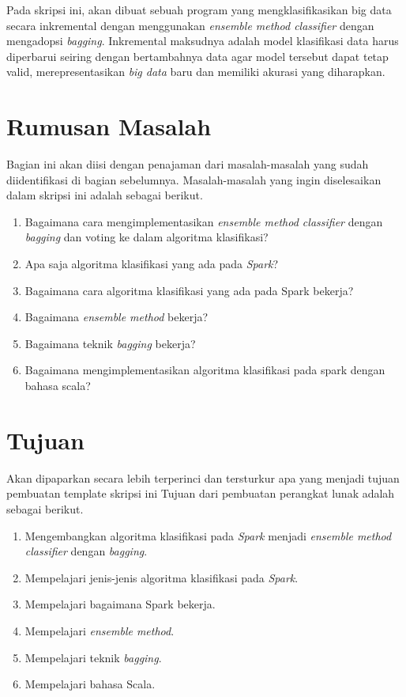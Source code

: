 Pada skripsi ini, akan dibuat sebuah program yang mengklasifikasikan big data secara inkremental dengan menggunakan \textit{ensemble method classifier} dengan mengadopsi \textit{bagging}. Inkremental maksudnya adalah model klasifikasi data harus diperbarui seiring dengan bertambahnya data agar model tersebut dapat tetap valid, merepresentasikan \textit{big data} baru dan memiliki akurasi yang diharapkan.

\section{Rumusan Masalah}
\label{sec:rumusan}
Bagian ini akan diisi dengan penajaman dari masalah-masalah yang sudah diidentifikasi di bagian sebelumnya. 
Masalah-masalah yang ingin diselesaikan dalam skripsi ini adalah sebagai berikut.
\begin{enumerate}
\item Bagaimana cara mengimplementasikan \textit{ensemble method classifier} dengan \textit{bagging} dan voting ke dalam algoritma klasifikasi?
\item Apa saja algoritma klasifikasi yang ada pada \textit{Spark}?
\item Bagaimana cara algoritma klasifikasi yang ada pada Spark bekerja?
\item Bagaimana \textit{ensemble method} bekerja?
\item Bagaimana teknik \textit{bagging} bekerja?\\
\item Bagaimana mengimplementasikan algoritma klasifikasi pada spark dengan bahasa scala?
\end{enumerate}


\section{Tujuan}
\label{sec:tujuan}
Akan dipaparkan secara lebih terperinci dan tersturkur apa yang menjadi tujuan pembuatan template skripsi ini
Tujuan dari pembuatan perangkat lunak adalah sebagai berikut.
\begin{enumerate}
\item Mengembangkan algoritma klasifikasi pada \textit{Spark} menjadi \textit{ensemble method classifier} dengan \textit{bagging}.
\item Mempelajari jenis-jenis algoritma klasifikasi pada \textit{Spark}.
\item Mempelajari bagaimana Spark bekerja.
\item Mempelajari \textit{ensemble method}.
\item Mempelajari teknik \textit{bagging}.
\item Mempelajari bahasa Scala.
\end{enumerate}


